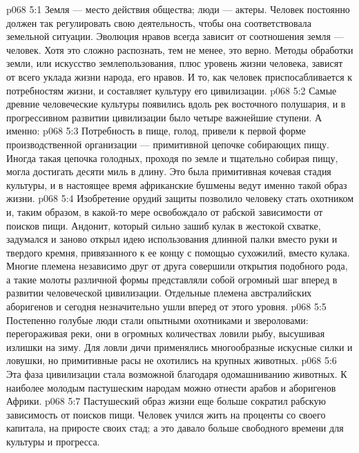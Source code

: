 \vs p068 5:1 Земля --- место действия общества; люди --- актеры. Человек постоянно должен так регулировать свою деятельность, чтобы она соответствовала земельной ситуации. Эволюция нравов всегда зависит от соотношения земля --- человек. Хотя это сложно распознать, тем не менее, это верно. Методы обработки земли, или искусство землепользования, плюс уровень жизни человека, зависят от всего уклада жизни народа, его нравов. И то, как человек приспосабливается к потребностям жизни, и составляет культуру его цивилизации.
\vs p068 5:2 Самые древние человеческие культуры появились вдоль рек восточного полушария, и в прогрессивном развитии цивилизации было четыре важнейшие ступени. А именно:
\vs p068 5:3 \bibnobreakspace {} Потребность в пище, голод, привели к первой форме производственной организации --- примитивной цепочке собирающих пищу. Иногда такая цепочка голодных, проходя по земле и тщательно собирая пищу, могла достигать десяти миль в длину. Это была примитивная кочевая стадия культуры, и в настоящее время африканские бушмены ведут именно такой образ жизни.
\vs p068 5:4 \pc {}\bibnobreakspace {} Изобретение орудий защиты позволило человеку стать охотником и, таким образом, в какой\hyp{}то мере освобождало от рабской зависимости от поисков пищи. Андонит, который сильно зашиб кулак в жестокой схватке, задумался и заново открыл идею использования длинной палки вместо руки и твердого кремня, привязанного к ее концу с помощью сухожилий, вместо кулака. Многие племена независимо друг от друга совершили открытия подобного рода, а такие молоты различной формы представляли собой огромный шаг вперед в развитии человеческой цивилизации. Отдельные племена австралийских аборигенов и сегодня незначительно ушли вперед от этого уровня.
\vs p068 5:5 Постепенно голубые люди стали опытными охотниками и звероловами: перегораживая реки, они в огромных количествах ловили рыбу, высушивая излишки на зиму. Для ловли дичи применялись многообразные искусные силки и ловушки, но примитивные расы не охотились на крупных животных.
\vs p068 5:6 \pc {}\bibnobreakspace {} Эта фаза цивилизации стала возможной благодаря одомашниванию животных. К наиболее молодым пастушеским народам можно отнести арабов и аборигенов Африки.
\vs p068 5:7 Пастушеский образ жизни еще больше сократил рабскую зависимость от поисков пищи. Человек учился жить на проценты со своего капитала, на приросте своих стад; а это давало больше свободного времени для культуры и прогресса.
